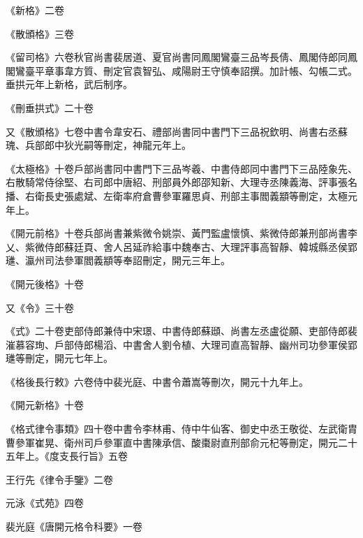 \begin{pinyinscope}
 《新格》二卷



 《散頒格》三卷



 《留司格》六卷秋官尚書裴居道、夏官尚書同鳳閣鸞臺三品岑長倩、鳳閣侍郎同鳳閣鸞臺平章事韋方質、刪定官袁智弘、咸陽尉王守慎奉詔撰。加計帳、勾帳二式。垂拱元年上新格，武后制序。



 《刪垂拱式》二十卷



 又《散頒格》七卷中書令韋安石、禮部尚書同中書門下三品祝欽明、尚書右丞蘇瑰、兵部郎中狄光嗣等刪定，神龍元年上。



 《太極格》十卷戶部尚書同中書門下三品岑羲、中書侍郎同中書門下三品陸象先、右散騎常侍徐堅、右司郎中唐紹、刑部員外郎邵知新、大理寺丞陳義海、評事張名播、右衛長史張處斌、左衛率府倉曹參軍羅思貞、刑部主事閻義顓等刪定，太極元年上。



 《開元前格》十卷兵部尚書兼紫微令姚崇、黃門監盧懷慎、紫微侍郎兼刑部尚書李乂、紫微侍郎蘇廷頁、舍人呂延祚給事中魏奉古、大理評事高智靜、韓城縣丞侯郢璡、瀛州司法參軍閻義顓等奉詔刪定，開元三年上。



 《開元後格》十卷



 又《令》三十卷



 《式》二十卷吏部侍郎兼侍中宋璟、中書侍郎蘇頲、尚書左丞盧從願、吏部侍郎裴漼慕容珣、戶部侍郎楊滔、中書舍人劉令植、大理司直高智靜、幽州司功參軍侯郢璡等刪定，開元七年上。



 《格後長行敕》六卷侍中裴光庭、中書令蕭嵩等刪次，開元十九年上。



 《開元新格》十卷



 《格式律令事類》四十卷中書令李林甫、侍中牛仙客、御史中丞王敬從、左武衛胄曹參軍崔晃、衛州司戶參軍直中書陳承信、酸棗尉直刑部俞元杞等刪定，開元二十五年上。《度支長行旨》五卷



 王行先《律令手鑒》二卷



 元泳《式苑》四卷



 裴光庭《唐開元格令科要》一卷




\end{pinyinscope}
